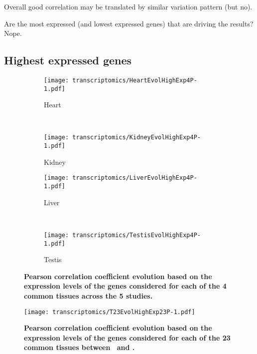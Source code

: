 Overall good correlation may be translated by similar variation pattern (but no).

Are the most expressed (and lowest expressed genes) that are driving the results? Nope.

\subsection{Highest expressed genes}

\begin{sidewaysfigure}[htpb]
    \centering
    \begin{subfigure}[b]{0.50\textwidth}\centering
        \texttt{[image: transcriptomics/HeartEvolHighExp4P-1.pdf]}
        \caption{Heart}\label{fig:CorHighExpHeart4T}
    \end{subfigure}%
~%
    \begin{subfigure}[b]{0.50\textwidth}\centering
        \texttt{[image: transcriptomics/KidneyEvolHighExp4P-1.pdf]}
        \caption{Kidney}\label{fig:CorHighExpKidney4T}
    \end{subfigure}

    \begin{subfigure}[b]{0.50\textwidth}\centering
        \texttt{[image: transcriptomics/LiverEvolHighExp4P-1.pdf]}
        \caption{Liver}\label{fig:CorHighExpLiver4T}
    \end{subfigure}%
~%
    \begin{subfigure}[b]{0.50\textwidth}\centering
        \texttt{[image: transcriptomics/TestisEvolHighExp4P-1.pdf]}
        \caption{Testis}\label{fig:CorHighExpTestis4T}
    \end{subfigure}
    \caption[Pearson correlation coefficient evolution based on the expression
    levels of the genes considered for each of the 4 common tissues]{%
\label{fig:CorHighExp4T}\textbf{Pearson correlation coefficient evolution
    based on the expression levels of the genes considered for each of the 4
    common tissues across the 5 studies.}}
\end{sidewaysfigure}


\begin{figure}[htpb]
    \texttt{[image: transcriptomics/T23EvolHighExp23P-1.pdf]}\centering
    \caption[Pearson correlation coefficient evolution based on the expression
    levels of the genes considered for each of the 23 common tissues]{%
\label{fig:CorHighExp23T}\textbf{Pearson correlation coefficient evolution based on the
expression levels of the genes considered for each of the 23 common tissues
between \uhlen\ and \gtex.}}
\end{figure}




